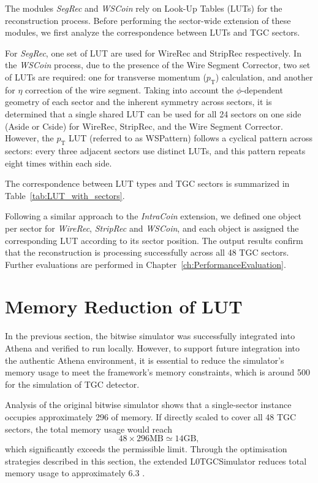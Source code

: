 The modules \textit{SegRec} and \textit{WSCoin} rely on Look-Up Tables (LUTs) for the reconstruction process. Before performing the sector-wide extension of these modules, we first analyze the correspondence between LUTs and TGC sectors.

For \textit{SegRec}, one set of LUT are used for WireRec and StripRec respectively. In the \textit{WSCoin} process, due to the presence of the Wire Segment Corrector, two set of LUTs are required: one for transverse momentum ($p_\mathrm{T}$) calculation, and another for $\eta$ correction of the wire segment. Taking into account the $\phi$-dependent geometry of each sector and the inherent symmetry across sectors, it is determined that a single shared LUT can be used for all 24 sectors on one side (Aside or Cside) for WireRec, StripRec, and the Wire Segment Corrector. However, the $p_\mathrm{T}$ LUT (referred to as WSPattern) follows a cyclical pattern across sectors: every three adjacent sectors use distinct LUTs, and this pattern repeats eight times within each side.

The correspondence between LUT types and TGC sectors is summarized in Table~\ref{tab:LUT_with_sectors}.


Following a similar approach to the \textit{IntraCoin} extension, we defined one object per sector for \textit{WireRec}, \textit{StripRec} and \textit{WSCoin}, and each object is assigned the corresponding LUT according to its sector position. The output results confirm that the reconstruction is processing successfully across all 48 TGC sectors. Further evaluations are performed in Chapter~\ref{ch:PerformanceEvaluation}.
\section{Memory Reduction of LUT} \label{MemoryReduction}
In the previous section, the bitwise simulator was successfully integrated into Athena and verified to run locally. However, to support future integration into the authentic Athena environment, it is essential to reduce the simulator's memory usage to meet the framework’s memory constraints, which is around 500  for the simulation of TGC detector.

Analysis of the original bitwise simulator shows that a single-sector instance occupies approximately 296  of memory. If directly scaled to cover all 48 TGC sectors, the total memory usage would reach
\[
48 \times 296 \text{MB} \simeq 14 \text{GB},
\]
which significantly exceeds the permissible limit. Through the optimisation strategies described in this section, the extended L0TGCSimulator reduces total memory usage to approximately 6.3 .

